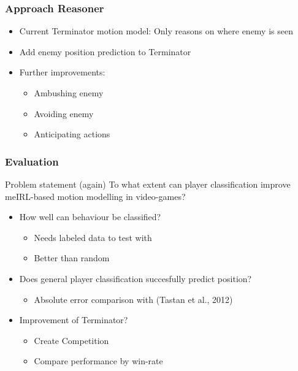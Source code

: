 \documentclass{beamer}
\begin{document}
        \begin{frame}
            \frametitle{Approach Reasoner}
            \begin{itemize}
                \item Current Terminator motion model:
                    Only reasons on where enemy is seen
                \item Add enemy position prediction to Terminator 
                \item Further improvements:
                    \begin{itemize}
                        \item Ambushing enemy
                        \item Avoiding enemy
                        \item Anticipating actions
                    \end{itemize}
            \end{itemize}
        \end{frame}


        \begin{frame}
            \frametitle{Evaluation}
            \begin{block}{Problem statement (again)}
                To what extent can player classification improve meIRL-based motion modelling
                in video-games?
            \end{block}
            \begin{itemize}
                \item How well can behaviour be classified?
                    \begin{itemize}
                        \item Needs labeled data to test with
                        \item Better than random
                    \end{itemize}
                \item Does general player classification succesfully predict position?
                    \begin{itemize}
                        \item Absolute error comparison with (Tastan et al., 2012)
                    \end{itemize}
                \item Improvement of Terminator?
                    \begin{itemize}
                        \item Create Competition
                        \item Compare performance by win-rate
                    \end{itemize}
            \end{itemize}
        \end{frame}
\end{document}
